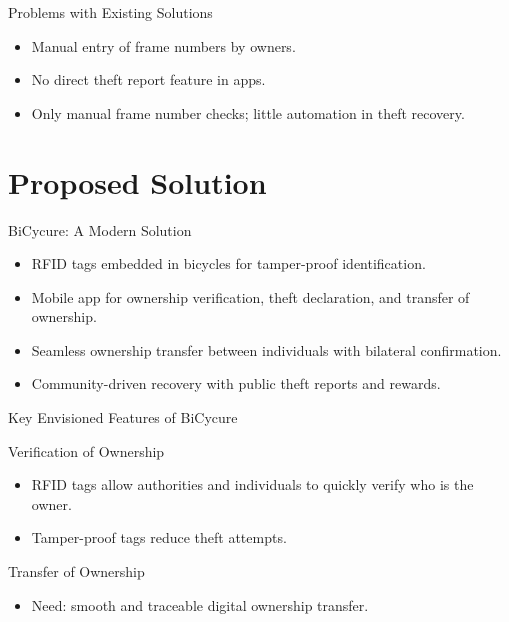 \documentclass{beamer}
\begin{document}
\begin{frame}{Problems with Existing Solutions}
    \begin{itemize}
        \item Manual entry of frame numbers by owners.
        \item No direct theft report feature in apps.
        \item Only manual frame number checks; little automation in theft recovery.
    \end{itemize}
\end{frame}

\section{Proposed Solution}
\begin{frame}{BiCycure: A Modern Solution}
    \begin{itemize}
        \item RFID tags embedded in bicycles for tamper-proof identification.
        \item Mobile app for ownership verification, theft declaration, and transfer of ownership.
        \item Seamless ownership transfer between individuals with bilateral confirmation.
        \item Community-driven recovery with public theft reports and rewards.
    \end{itemize}
\end{frame}

\begin{frame}{Key Envisioned Features of BiCycure}
    \begin{block}{Verification of Ownership}
        \begin{itemize}
            \item RFID tags allow authorities and individuals to quickly verify who is the owner.
            \item Tamper-proof tags reduce theft attempts.
        \end{itemize}
    \end{block}
    
    \begin{block}{Transfer of Ownership}
        \begin{itemize}
            \item Need: smooth and traceable digital ownership transfer.
        \end{itemize}
    \end{block}
\end{frame}
\end{document}
